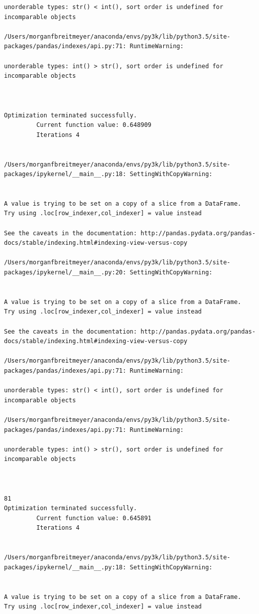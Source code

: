 \begin{lstlisting}
unorderable types: str() < int(), sort order is undefined for incomparable objects

/Users/morganfbreitmeyer/anaconda/envs/py3k/lib/python3.5/site-packages/pandas/indexes/api.py:71: RuntimeWarning:

unorderable types: int() > str(), sort order is undefined for incomparable objects



Optimization terminated successfully.
         Current function value: 0.648909
         Iterations 4


/Users/morganfbreitmeyer/anaconda/envs/py3k/lib/python3.5/site-packages/ipykernel/__main__.py:18: SettingWithCopyWarning:


A value is trying to be set on a copy of a slice from a DataFrame.
Try using .loc[row_indexer,col_indexer] = value instead

See the caveats in the documentation: http://pandas.pydata.org/pandas-docs/stable/indexing.html#indexing-view-versus-copy

/Users/morganfbreitmeyer/anaconda/envs/py3k/lib/python3.5/site-packages/ipykernel/__main__.py:20: SettingWithCopyWarning:


A value is trying to be set on a copy of a slice from a DataFrame.
Try using .loc[row_indexer,col_indexer] = value instead

See the caveats in the documentation: http://pandas.pydata.org/pandas-docs/stable/indexing.html#indexing-view-versus-copy

/Users/morganfbreitmeyer/anaconda/envs/py3k/lib/python3.5/site-packages/pandas/indexes/api.py:71: RuntimeWarning:

unorderable types: str() < int(), sort order is undefined for incomparable objects

/Users/morganfbreitmeyer/anaconda/envs/py3k/lib/python3.5/site-packages/pandas/indexes/api.py:71: RuntimeWarning:

unorderable types: int() > str(), sort order is undefined for incomparable objects



81
Optimization terminated successfully.
         Current function value: 0.645891
         Iterations 4


/Users/morganfbreitmeyer/anaconda/envs/py3k/lib/python3.5/site-packages/ipykernel/__main__.py:18: SettingWithCopyWarning:


A value is trying to be set on a copy of a slice from a DataFrame.
Try using .loc[row_indexer,col_indexer] = value instead


\end{lstlisting}
